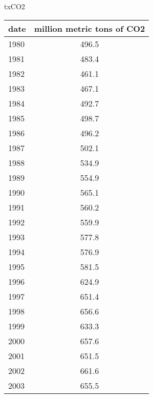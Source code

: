 \documentclass{mcmthesis}
\begin{document}
\begin{appendices}
\begin{minipage}{\textwidth}
  \begin{minipage}[t]{0.45\textwidth}
    \centering
      \makeatletter{}\makeatother\caption{txCO2}
      \begin{tabular}{|l|c|}
        \hline
        date & million metric tons of CO2 \\ \hline
        1980 & 496.5                      \\ \hline
        1981 & 483.4                      \\ \hline
        1982 & 461.1                      \\ \hline
        1983 & 467.1                      \\ \hline
        1984 & 492.7                      \\ \hline
        1985 & 498.7                      \\ \hline
        1986 & 496.2                      \\ \hline
        1987 & 502.1                      \\ \hline
        1988 & 534.9                      \\ \hline
        1989 & 554.9                      \\ \hline
        1990 & 565.1                      \\ \hline
        1991 & 560.2                      \\ \hline
        1992 & 559.9                      \\ \hline
        1993 & 577.8                      \\ \hline
        1994 & 576.9                      \\ \hline
        1995 & 581.5                      \\ \hline
        1996 & 624.9                      \\ \hline
        1997 & 651.4                      \\ \hline
        1998 & 656.6                      \\ \hline
        1999 & 633.3                      \\ \hline
        2000 & 657.6                      \\ \hline
        2001 & 651.5                      \\ \hline
        2002 & 661.6                      \\ \hline
        2003 & 655.5                      \\ \hline

\end{tabular}
\end{minipage}
\end{minipage}
\end{appendices}
\end{document}
